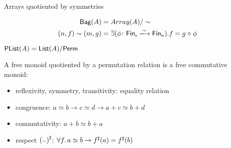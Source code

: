 \documentclass[9pt]{beamer}
\begin{document}
\begin{frame}[fragile]{Arrays quotiented by symmetries}
    \begin{dblock}
        \vspace{-0.4cm}
        \begin{align*}
            \type{Bag}(A) &= Array(A) / \sim          
            \\
            (n,f) \sim (m,g) &= 
                \exis{\phi\colon \Fin[n]\xto{\sim}\Fin[m]}{f = g \comp \phi}
        \end{align*}
    \end{dblock}
    \begin{dblock}
        $\mathsf{PList}(A) = \mathsf{List}(A) / \mathsf{Perm}$
    \end{dblock}

    A free monoid quotiented by a \alert{permutation relation} is a free commutative monoid:
    \begin{itemize}
        \item reflexivity, symmetry, transitivity: equality relation
        \item congruence: $a \simeq b \to c \simeq d \to a + c \simeq b + d$
        \item commutativity: $a + b \simeq b + a$
        \item respect ${({\scriptstyle{-}})}^{\sharp}$: $\forall f. \, a \simeq b \to {f}^{\sharp}(a) = {f}^{\sharp}(b)$
    \end{itemize}
\end{frame}
\end{document}
